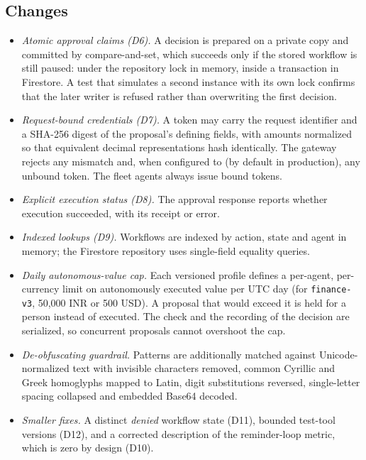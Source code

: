 \documentclass[conference]{IEEEtran}
\begin{document}
\subsection{Changes}
\begin{itemize}
\item \emph{Atomic approval claims (D6).} A decision is prepared on a private copy and committed by compare-and-set, which succeeds only if the stored workflow is still paused: under the repository lock in memory, inside a transaction in Firestore. A test that simulates a second instance with its own lock confirms that the later writer is refused rather than overwriting the first decision.
\item \emph{Request-bound credentials (D7).} A token may carry the request identifier and a SHA-256 digest of the proposal's defining fields, with amounts normalized so that equivalent decimal representations hash identically. The gateway rejects any mismatch and, when configured to (by default in production), any unbound token. The fleet agents always issue bound tokens.
\item \emph{Explicit execution status (D8).} The approval response reports whether execution succeeded, with its receipt or error.
\item \emph{Indexed lookups (D9).} Workflows are indexed by action, state and agent in memory; the Firestore repository uses single-field equality queries.
\item \emph{Daily autonomous-value cap.} Each versioned profile defines a per-agent, per-currency limit on autonomously executed value per UTC day (for \texttt{finance-v3}, 50{,}000 INR or 500 USD). A proposal that would exceed it is held for a person instead of executed. The check and the recording of the decision are serialized, so concurrent proposals cannot overshoot the cap.
\item \emph{De-obfuscating guardrail.} Patterns are additionally matched against Unicode-normalized text with invisible characters removed, common Cyrillic and Greek homoglyphs mapped to Latin, digit substitutions reversed, single-letter spacing collapsed and embedded Base64 decoded.
\item \emph{Smaller fixes.} A distinct \emph{denied} workflow state (D11), bounded test-tool versions (D12), and a corrected description of the reminder-loop metric, which is zero by design (D10).
\end{itemize}
\end{document}
